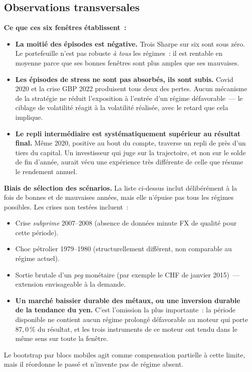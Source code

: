 \subsection{Observations transversales}

\begin{insightbox}
\textbf{Ce que ces six fenêtres établissent~:}
\begin{itemize}
\item \textbf{La moitié des épisodes est négative.} Trois Sharpe sur six sont sous zéro. Le portefeuille n'est pas robuste \emph{à tous} les régimes~: il est rentable en moyenne parce que ses bonnes fenêtres sont plus amples que ses mauvaises.
\item \textbf{Les épisodes de stress ne sont pas absorbés, ils sont subis.} Covid 2020 et la crise GBP 2022 produisent tous deux des pertes. Aucun mécanisme de la stratégie ne réduit l'exposition à l'entrée d'un régime défavorable~--- le ciblage de volatilité réagit à la volatilité réalisée, avec le retard que cela implique.
\item \textbf{Le repli intermédiaire est systématiquement supérieur au résultat final.} Même 2020, positive au bout du compte, traverse un repli de près d'un tiers du capital. Un investisseur qui juge sur la trajectoire, et non sur le solde de fin d'année, aurait vécu une expérience très différente de celle que résume le rendement annuel.
\end{itemize}
\end{insightbox}

\begin{warningbox}
\textbf{Biais de sélection des scénarios.} La liste ci-dessus inclut délibérément à la fois de bonnes et de mauvaises années, mais elle n'épuise pas tous les régimes possibles. Les crises non testées incluent~:
\begin{itemize}
\item Crise \emph{subprime} 2007--2008 (absence de données minute FX de qualité pour cette période).
\item Choc pétrolier 1979--1980 (structurellement différent, non comparable au régime actuel).
\item Sortie brutale d'un \emph{peg} monétaire (par exemple le CHF de janvier 2015)~--- extension envisageable à la demande.
\item \textbf{Un marché baissier durable des métaux, ou une inversion durable de la tendance du yen.} C'est l'omission la plus importante~: la période disponible ne contient aucun régime prolongé défavorable au moteur qui porte $87{,}0\,\%$ du résultat, et les trois instruments de ce moteur ont tendu dans le même sens sur toute la fenêtre.
\end{itemize}
Le bootstrap par blocs mobiles agit comme compensation partielle à cette limite, mais il réordonne le passé et n'invente pas de régime absent.
\end{warningbox}

